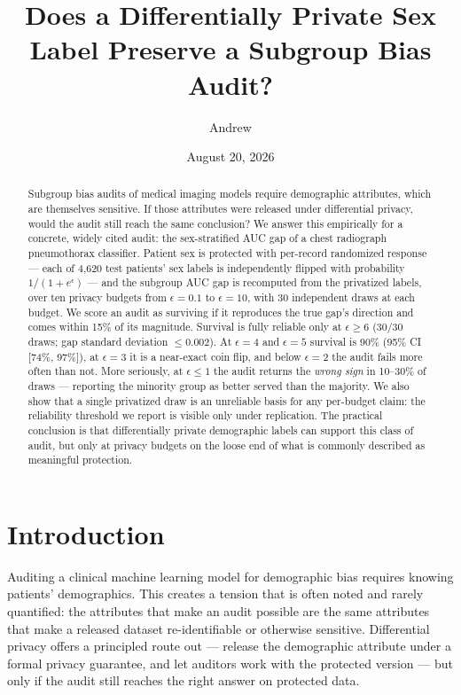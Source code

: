 \documentclass[11pt]{article}
\title{Does a Differentially Private Sex Label Preserve a Subgroup Bias Audit?}
\author{Andrew}
\date{August 20, 2026}
\begin{document}
\maketitle

\begin{abstract}
\noindent Subgroup bias audits of medical imaging models require demographic attributes, which are themselves sensitive. If those attributes were released under differential privacy, would the audit still reach the same conclusion? We answer this empirically for a concrete, widely cited audit: the sex-stratified AUC gap of a chest radiograph pneumothorax classifier. Patient sex is protected with per-record randomized response --- each of 4,620 test patients' sex labels is independently flipped with probability $1/(1+e^{\epsilon})$ --- and the subgroup AUC gap is recomputed from the privatized labels, over ten privacy budgets from $\epsilon=0.1$ to $\epsilon=10$, with 30 independent draws at each budget. We score an audit as surviving if it reproduces the true gap's direction and comes within 15\% of its magnitude. Survival is fully reliable only at $\epsilon \geq 6$ (30/30 draws; gap standard deviation $\leq0.002$). At $\epsilon=4$ and $\epsilon=5$ survival is 90\% (95\% CI [74\%, 97\%]), at $\epsilon=3$ it is a near-exact coin flip, and below $\epsilon=2$ the audit fails more often than not. More seriously, at $\epsilon \leq 1$ the audit returns the \emph{wrong sign} in 10--30\% of draws --- reporting the minority group as better served than the majority. We also show that a single privatized draw is an unreliable basis for any per-budget claim: the reliability threshold we report is visible only under replication. The practical conclusion is that differentially private demographic labels can support this class of audit, but only at privacy budgets on the loose end of what is commonly described as meaningful protection.
\end{abstract}

\section{Introduction}

Auditing a clinical machine learning model for demographic bias requires knowing patients' demographics. This creates a tension that is often noted and rarely quantified: the attributes that make an audit possible are the same attributes that make a released dataset re-identifiable or otherwise sensitive. Differential privacy \cite{dwork2006, dwork2014} offers a principled route out --- release the demographic attribute under a formal privacy guarantee, and let auditors work with the protected version --- but only if the audit still reaches the right answer on protected data.
\end{document}
